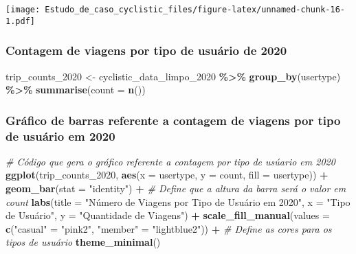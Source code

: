 \documentclass[
]{article}
\newenvironment{Shaded}{\begin{snugshade}}{\end{snugshade}}
\newcommand{\AttributeTok}[1]{\textcolor[rgb]{0.13,0.29,0.53}{#1}}
\newcommand{\CommentTok}[1]{\textcolor[rgb]{0.56,0.35,0.01}{\textit{#1}}}
\newcommand{\FunctionTok}[1]{\textcolor[rgb]{0.13,0.29,0.53}{\textbf{#1}}}
\newcommand{\NormalTok}[1]{#1}
\newcommand{\OtherTok}[1]{\textcolor[rgb]{0.56,0.35,0.01}{#1}}
\newcommand{\SpecialCharTok}[1]{\textcolor[rgb]{0.81,0.36,0.00}{\textbf{#1}}}
\newcommand{\StringTok}[1]{\textcolor[rgb]{0.31,0.60,0.02}{#1}}
\begin{document}
\texttt{[image: Estudo\_de\_caso\_cyclistic\_files/figure-latex/unnamed-chunk-16-1.pdf]}

\subsubsection{Contagem de viagens por tipo de usuário de
2020}\label{contagem-de-viagens-por-tipo-de-usuuxe1rio-de-2020}

\begin{Shaded}
\begin{Highlighting}[]
\NormalTok{trip\_counts\_2020 }\OtherTok{\textless{}{-}}\NormalTok{ cyclistic\_data\_limpo\_2020 }\SpecialCharTok{\%\textgreater{}\%}
  \FunctionTok{group\_by}\NormalTok{(usertype) }\SpecialCharTok{\%\textgreater{}\%}
  \FunctionTok{summarise}\NormalTok{(}\AttributeTok{count =} \FunctionTok{n}\NormalTok{())}
\end{Highlighting}
\end{Shaded}

\subsubsection{Gráfico de barras referente a contagem de viagens por
tipo de usuário em
2020}\label{gruxe1fico-de-barras-referente-a-contagem-de-viagens-por-tipo-de-usuuxe1rio-em-2020}

\begin{Shaded}
\begin{Highlighting}[]
\CommentTok{\# Código que gera o gráfico referente a contagem por tipo de usúario em 2020}
\FunctionTok{ggplot}\NormalTok{(trip\_counts\_2020, }\FunctionTok{aes}\NormalTok{(}\AttributeTok{x =}\NormalTok{ usertype, }\AttributeTok{y =}\NormalTok{ count, }\AttributeTok{fill =}\NormalTok{ usertype)) }\SpecialCharTok{+}
  \FunctionTok{geom\_bar}\NormalTok{(}\AttributeTok{stat =} \StringTok{"identity"}\NormalTok{) }\SpecialCharTok{+}  \CommentTok{\# Define que a altura da barra será o valor em \textquotesingle{}count\textquotesingle{}}
  \FunctionTok{labs}\NormalTok{(}\AttributeTok{title =} \StringTok{"Número de Viagens por Tipo de Usuário em 2020"}\NormalTok{, }
       \AttributeTok{x =} \StringTok{"Tipo de Usuário"}\NormalTok{, }\AttributeTok{y =} \StringTok{"Quantidade de Viagens"}\NormalTok{) }\SpecialCharTok{+}
  \FunctionTok{scale\_fill\_manual}\NormalTok{(}\AttributeTok{values =} \FunctionTok{c}\NormalTok{(}\StringTok{"casual"} \OtherTok{=} \StringTok{"pink2"}\NormalTok{, }\StringTok{"member"} \OtherTok{=} \StringTok{"lightblue2"}\NormalTok{)) }\SpecialCharTok{+}  \CommentTok{\# Define as cores para os tipos de usuário}
  \FunctionTok{theme\_minimal}\NormalTok{()}
\end{Highlighting}
\end{Shaded}
\end{document}
